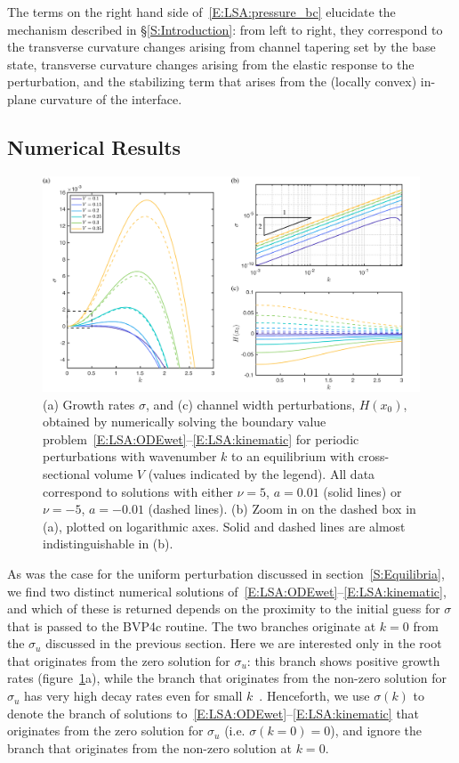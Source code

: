 \documentclass{jfm}
\begin{document}
The terms on the right hand side of~\eqref{E:LSA:pressure_bc} elucidate the mechanism described in \S\ref{S:Introduction}: from left to right, they correspond to the transverse curvature changes arising from channel tapering set by the base state, transverse curvature changes arising from the elastic response to the perturbation, and the stabilizing term that arises from the (locally convex) in-plane curvature of the interface.


\subsection{Numerical Results}

\begin{figure}
\centering
\includegraphics[width =\textwidth]{figures/fig6_growth_rates.pdf}
\caption{(a) Growth rates $\sigma$, and (c) channel width perturbations, $H(x_0)$, obtained by numerically solving the boundary value problem~\eqref{E:LSA:ODEwet}--\eqref{E:LSA:kinematic} for periodic perturbations with wavenumber $k$ to an equilibrium with cross-sectional volume $V$ (values indicated by the legend). All data correspond to solutions with either $\nu = 5$, $a = 0.01$ (solid lines) or $\nu = -5$, $a = -0.01$ (dashed lines). (b) Zoom in on the dashed box in (a), plotted on logarithmic axes. Solid and dashed lines are almost indistinguishable in (b).}
\label{fig:LinearStability:GrowthRates}
\end{figure}


As was the case for the uniform perturbation discussed in section~\ref{S:Equilibria}, we find two distinct numerical solutions of~\eqref{E:LSA:ODEwet}--\eqref{E:LSA:kinematic}, and which of these is returned depends on the proximity to the initial guess for $\sigma$ that is passed to the BVP4c routine. The two branches originate at $k=0$ from the $\sigma_u$ discussed in the previous section. Here we are interested only in the root that originates from the zero solution for $\sigma_u$: this branch shows positive growth rates (figure~\ref{fig:LinearStability:GrowthRates}a), while the branch that originates from the non-zero solution for $\sigma_u$ has very high decay rates even for small $k$~\citep[not shown, but see Ch. 5 of][]{BradleyPhDthesis}. Henceforth, we use $\sigma(k)$ to denote the branch of solutions to~\eqref{E:LSA:ODEwet}--\eqref{E:LSA:kinematic} that originates from the zero solution for $\sigma_u$ (i.e. $\sigma(k=0) = 0$), and ignore the branch that originates from the non-zero solution at $k = 0$.
\end{document}
